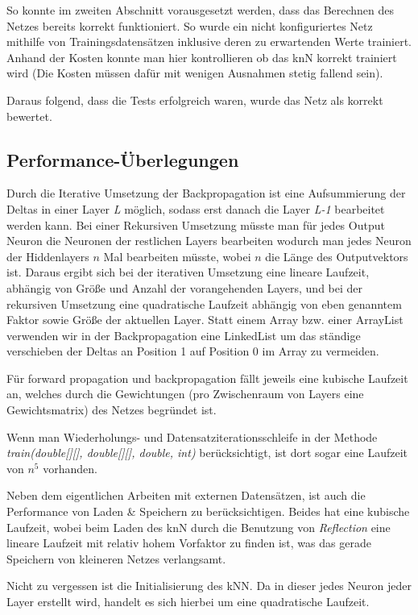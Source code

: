 \documentclass[paper=A4,pagesize=auto,12pt,headinclude=true,footinclude=true,BCOR=0mm,DIV=calc]{scrartcl}
\begin{document}
So konnte im zweiten Abschnitt vorausgesetzt werden, dass das Berechnen des Netzes bereits korrekt funktioniert. So wurde ein nicht konfiguriertes Netz mithilfe von Trainingsdatensätzen inklusive deren zu erwartenden Werte trainiert. Anhand der Kosten konnte man hier kontrollieren ob das knN korrekt trainiert wird (Die Kosten müssen dafür mit wenigen Ausnahmen stetig fallend sein). 

Daraus folgend, dass die Tests erfolgreich waren, wurde das Netz als korrekt bewertet.

\subsection{Performance-Überlegungen}
Durch die Iterative Umsetzung der Backpropagation ist eine Aufsummierung der Deltas in einer Layer \textit{L} möglich, sodass erst danach die Layer \textit{L-1} bearbeitet werden kann. Bei einer Rekursiven Umsetzung müsste man für jedes Output Neuron die Neuronen der restlichen Layers bearbeiten wodurch man jedes Neuron der Hiddenlayers $n$ Mal bearbeiten müsste, wobei $n$ die Länge des Outputvektors ist. Daraus ergibt sich bei der iterativen Umsetzung eine lineare Laufzeit, abhängig von Größe und Anzahl der vorangehenden Layers, und bei der rekursiven Umsetzung eine quadratische Laufzeit abhängig von eben genanntem Faktor sowie Größe der aktuellen Layer.
Statt einem Array bzw. einer ArrayList verwenden wir in der Backpropagation eine LinkedList um das ständige verschieben der Deltas an Position 1 auf Position 0 im Array zu vermeiden.

Für forward propagation und backpropagation fällt jeweils eine kubische Laufzeit an, welches durch die Gewichtungen (pro Zwischenraum von Layers eine Gewichtsmatrix) des Netzes begründet ist.

Wenn man Wiederholungs- und Datensatziterationsschleife in der Methode \textit{train(double[][], double[][], double, int)} berücksichtigt, ist dort sogar eine Laufzeit von $n^5$ vorhanden.

Neben dem eigentlichen Arbeiten mit externen Datensätzen, ist auch die Performance von Laden  \& Speichern zu berücksichtigen. Beides hat eine kubische Laufzeit, wobei beim Laden des knN durch die Benutzung von \textit{Reflection} eine lineare Laufzeit mit relativ hohem Vorfaktor zu finden ist, was das gerade Speichern von kleineren Netzes verlangsamt.

Nicht zu vergessen ist die Initialisierung des kNN. Da in dieser jedes Neuron jeder Layer erstellt wird, handelt es sich hierbei um eine quadratische Laufzeit.
\end{document}
